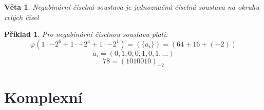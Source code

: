 \documentclass[12pt]{book}
\newtheorem{definice}{Definice}
\newtheorem{veta}{Věta}
\newtheorem*{pr}{Příklad}
\begin{document}
\begin{veta}
	Negabinární číselná soustava je jednoznačná číselná soustava na okruhu celých čísel
\end{veta}

\begin{pr}
	Pro negabinární číselnou soustavu platí:
	$$\varphi(1\cdot-2^6+1\cdot-2^4+1\cdot-2^1)=(\{a_i\})=(64+16+(-2))$$
	$${a_i}=(0,1,0,0,1,0,1,\dots) $$
	$$78 =(1010010)_{-2}$$
\end{pr}












\chapter{Komplexní}
\end{document}
